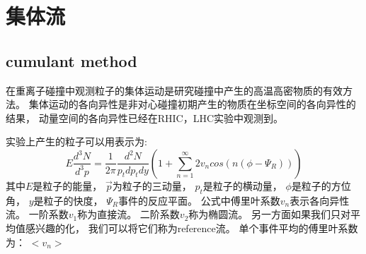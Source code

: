 \chapter{集体流}
\section{cumulant method}
在重离子碰撞中观测粒子的集体运动是研究碰撞中产生的高温高密物质的有效方法。
集体运动的各向异性是非对心碰撞初期产生的物质在坐标空间的各向异性的结果，
动量空间的各向异性已经在RHIC，LHC实验中观测到。

实验上产生的粒子可以用表示为:
\begin{equation}
  \label{seveneq:1}
  E\frac{d^{3}N}{d^{3}p} = \frac{1}{2\pi}\frac{d^{2}N}{p_{t}dp_{t}dy}\left(1+\sum_{n=1}^{\infty}2v_{n}cos(n(\phi-\Psi_{R})) \right)
\end{equation}
其中$ E $是粒子的能量，
$ \vec{p} $为粒子的三动量，%
$ p_{t} $是粒子的横动量，%
$ \phi $是粒子的方位角，%
$ y $是粒子的快度，%
$ \Psi_{R} $事件的反应平面。%
公式\label{seveneq:1}中傅里叶系数$ v_{n} $表示各向异性流。%
一阶系数$ v_{1} $称为直接流。%
二阶系数$ v_{2} $称为椭圆流。%
另一方面如果我们只对平均值感兴趣的化，
我们可以将它们称为reference流。%
单个事件平均的傅里叶系数为：
$<v_{n}>$ 

